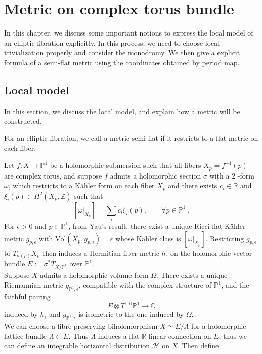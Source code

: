 
\chapter{Metric on complex torus bundle}
In this chapter, we discuss some important notions to express the local model of an elliptic fibration explicitly. In this process, we need to choose local trivialization properly and consider the monodromy. We then give a explicit formula of a semi-flat metric using the coordinates obtained by period map.
\section{Local model}
In this section, we discuss the local model, and explain how a metric will be constructed.
\begin{defi}
For an elliptic fibration, we call a metric semi-flat
if it restricts to a flat metric on each fiber.
\end{defi}
Let $f\colon X\rightarrow \mathbb{P}^1$ be a holomorphic submersion such that all fibers $X_p=f^{-1}(p)$ are complex torus, and suppose $f$ admits a holomorphic section $\sigma$ with a 2
-form $\omega$, which restricts to a K{\"a}hler form on each fiber $X_p$ and there exists $c_i\in\mathbb{R}$ and $\xi_i(p)\in H^2(X_p,\mathbb{Z})$ such that
$$[\omega|_{X_p}]=\sum_i c_i\xi_i(p),\qquad  \forall p\in\mathbb{P}^1 \;.$$
\indent For $\epsilon>0$ and $p\in\mathbb{P}^1$, from Yau's result\cite{yau1978ricci}, there exist a unique Ricci-flat K{\"a}hler metric $g_{p,\epsilon}$ with $\textrm{Vol}(X_p,g_{p,\epsilon})=\epsilon$ whose K{\"a}hler class is $[\omega|_{X_p}]$. Restricting $g_{p,\epsilon}$ to $T_{\sigma(p)}X_p$ then induces a Hermitian fiber metric $h_\epsilon$ on the holomorphic vector bundle $E:=\sigma^*T_{X/\mathbb{P}^1}$ over $\mathbb{P}^1$.\\ \indent
Suppose $X$ admits a holomorphic volume form $\Omega$. There exists a unique Riemannian metric $g_{\mathbb{P}^1,\epsilon}$, compatible with the complex structure of $\mathbb{P}^1$, and the faithful pairing 
$$E\otimes T^{1,0}\mathbb{P}^1\rightarrow \mathbb{C}$$
induced by $h_\epsilon$ and $g_{\mathbb{P}^1,\epsilon}$ is isometric to the one induced by $\Omega$.\\ \indent
We can choose a fibre-preserving biholomorphism $X\simeq E/\Lambda$ for a holomorphic lattice bundle $\Lambda\subset E$. Thus $\Lambda$ induces a flat $\mathbb{R}$-linear connection on $E$, thus we can define an integrable horizontal distribution $\mathscr{H}$ on $X$. Then define
